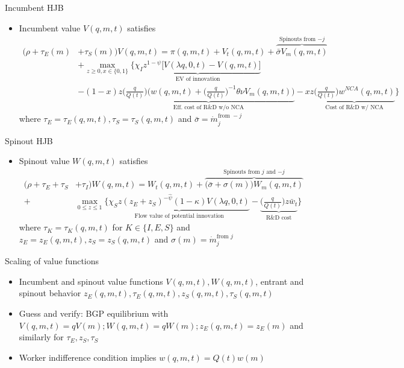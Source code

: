 \documentclass[english,usenames,dvipsnames]{beamer}
\begin{document}
\begin{frame}{Incumbent HJB}\label{HJB_incumbent}
\hyperlink{closing_the_model}{}
\begin{itemize}
\item Incumbent value $V(q,m,t)$ satisfies
\tiny
\begin{align*}
(\rho + \tau_E(m)& + \tau_S(m)) V(q,m,t) = \pi(q,m,t) + V_t(q,m,t) + \overbrace{\bar{\sigma}V_m(q,m,t)}^{\textrm{Spinouts from $-j$}}  \nonumber \\ 
&+ \max_{z \ge 0, x\in \{0,1\}} \Big\{ \underbrace{\chi_I z^{1-\psi} \Big[V(\lambda q,0,t) - V(q,m,t) \Big]}_{\textrm{EV of innovation}} \\
&-(1-x) z \underbrace{\Big(\frac{q}{Q(t)}\Big) \Big(  w(q,m,t) + \Big(\frac{q}{Q(t)}\Big)^{-1} \theta \nu V_m(q,m,t) \Big)}_{\textrm{Eff. cost of R\&D w/o NCA}} - xz \underbrace{\Big( \frac{q}{Q(t)} \Big) w^{NCA}(q,m,t)}_{\textrm{Cost of R\&D w/ NCA}} \Big\} 
\end{align*}
\footnotesize
where $\tau_E = \tau_E(q,m,t),\tau_S = \tau_S(q,m,t)$ and $\bar{\sigma} = \dot{m}_j^{\textrm{from } -j}$
\end{itemize}
\end{frame}


\begin{frame}{Spinout HJB}\label{HJB_spinout}
\hyperlink{closing_the_model}{}
\begin{itemize}
\item Spinout value $W(q,m,t)$ satisfies
\scriptsize
\begin{align*}
(\rho  + \tau_E + \tau_S& + \tau_I)W(q,m,t) = W_t(q,m,t) + \overbrace{\big(\bar{\sigma} + \sigma(m) \big)W_m(q,m,t)}^{\textrm{Spinouts from $j$ and $-j$}}\nonumber \\
+& \max_{0 \le z \le 1} \Big\{ \underbrace{\chi_S z (z_E + z_S)^{-\hat{\psi}} (1-\kappa) V(\lambda q,0,t)}_{\textrm{Flow value of potential innovation}} - \underbrace{\Big(\frac{q}{Q(t)}\Big) z \bar{w}_t}_{\textrm{R\&D cost}} \Big\} 
\end{align*}
\footnotesize
where $\tau_K = \tau_K(q,m,t)$ for $K \in \{I,E,S\}$ and $z_E = z_E(q,m,t), z_S = z_S(q,m,t)$ and $\sigma(m) = \dot{m}_j^{\textrm{from }j}$
\end{itemize}
\end{frame}


\begin{frame}{Scaling of value functions}\label{scaling_of_value_functions}
\hyperlink{closing_the_model}{}
\begin{itemize}
\item Incumbent and spinout value functions $V(q,m,t),W(q,m,t)$, entrant and spinout behavior $z_E(q,m,t),\tau_E(q,m,t),z_S(q,m,t),\tau_S(q,m,t)$ 
\item Guess and verify: BGP equilibrium with $V(q,m,t) = qV(m); W(q,m,t) = qW(m); z_E(q,m,t) = z_E(m)$ and similarly for $\tau_E,z_S,\tau_S$
\item Worker indifference condition implies $w(q,m,t) = Q(t) w(m)$ 
\end{itemize}
\end{frame}
\end{document}
